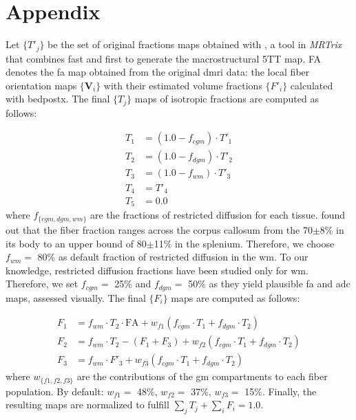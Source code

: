 \documentclass[english]{frontiers/frontiersSCNS} %
\begin{document}

\glsresetall
\linenumbers
\section*{Appendix}\label{sec:appendix}
Let $\{T'_j\}$ be the set of original fractions maps obtained with , a
  tool in \emph{MRTrix} that combines \gls*{fast} and \gls*{first}
  to generate the macrostructural 5TT map.
FA denotes the \gls*{fa} map obtained from the original \gls*{dmri} data: the local fiber orientation maps
  $\{\mathbf{V}_i\}$ with their estimated volume fractions $\{F'_i\}$ calculated with \gls*{bedpostx}.
The final $\{T_j\}$ maps of isotropic fractions are computed as follows:

  \begin{align*}
  T_1 &= (1.0-f_{cgm}) \cdot T'_1 \\
  T_2 &= (1.0-f_{dgm}) \cdot T'_2 \\
  T_3 &= (1.0-f_{wm}) \cdot T'_3 \\
  T_4 &= T'_4 \\
  T_5 &= 0.0
  \end{align*}
where $f_{\{cgm, dgm, wm\}}$ are the fractions of restricted diffusion for each tissue.
\cite{sepehrband_brain_2015} found out that the fiber fraction ranges across the corpus
  callosum from the 70$\pm$8\% in its body to an upper bound of 80$\pm$11\% in the splenium.
Therefore, we choose $f_{wm} =$ 80\% as default fraction of restricted diffusion in the
  \gls*{wm}.
To our knowledge, restricted diffusion fractions have been studied only for \gls*{wm}.
Therefore, we set $f_{cgm} =$ 25\% and $f_{dgm} =$ 50\% as they yield plausible \gls*{fa}
  and \gls*{adc} maps, assessed visually.
The final $\{F_i\}$ maps are computed as follows:

\begin{align*}
F_1 &= f_{wm} \cdot T_2 \cdot \text{FA} + w_{f1} (f_{cgm} \cdot T_1 + f_{dgm} \cdot T_2) \\
F_2 &= f_{wm} \cdot T_2 - (F_1 + F_3) + w_{f2} (f_{cgm} \cdot T_1 + f_{dgm} \cdot T_2) \\
F_3 &= f_{wm} \cdot F'_3 + w_{f3} (f_{cgm} \cdot T_1 + f_{dgm} \cdot T_2)
\end{align*}
where $w_{\{f1, f2, f3\}}$ are the contributions of the \gls*{gm} compartments to each fiber population.
By default: $w_{f1} = $ 48\%, $w_{f2} = $ 37\%, $w_{f3} = $ 15\%.
Finally, the resulting maps are normalized to fulfill $\sum_j T_j + \sum_i F_i = 1.0$.
\end{document}
